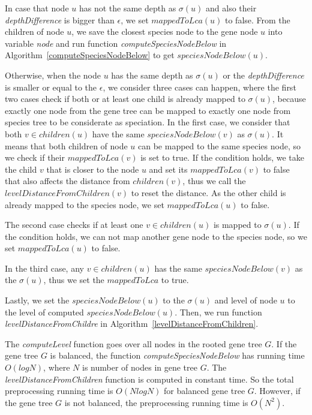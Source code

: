 In case that node $u$ has not the same depth as $\sigma(u)$ and also their \emph{depthDifference} is bigger than $\epsilon$, we set $mappedToLca(u)$ to false. From the children of node $u$, we save the closest species node to the gene node $u$ into variable \emph{node} and run function \emph{computeSpeciesNodeBelow} in Algorithm~\ref{computeSpeciesNodeBelow} to get $speciesNodeBelow(u)$. 

Otherwise, when the node $u$ has the same depth as $\sigma(u)$ or the \emph{depthDifference} is smaller or equal to the $\epsilon$, we consider three cases can happen, where the first two cases check if both or at least one child is already mapped to $\sigma(u)$, because exactly one node from the gene tree can be mapped to exactly one node from species tree to be considerate as speciation. In the first case, we consider that both $v \in children(u)$ have the same $speciesNodeBelow(v)$ as $\sigma(u)$. It means that both children of node $u$ can be mapped to the same species node, so we check if their $mappedToLca(v)$ is set to true. If the condition holds, we take the child $v$ that is closer to the node $u$ and set its $mappedToLca(v)$ to false that also affects the distance from $children(v)$, thus we call the $levelDistanceFromChildren(v)$ to reset the distance. As the other child is already mapped to the species node, we set $mappedToLca(u)$ to false.

The second case checks if at least one $v \in children(u)$ is mapped to $\sigma(u)$. If the condition holds, we can not map another gene node to the species node, so we set $mappedToLca(u)$ to false. 

In the third case, any $v \in children (u)$ has the same $speciesNodeBelow(v)$ as the $\sigma(u)$, thus we set the $mappedToLca$ to true.

Lastly, we set the $speciesNodeBelow(u)$ to the $\sigma(u)$ and level of node $u$ to the level of computed $speciesNodeBelow(u)$. Then, we run function \emph{levelDistanceFromChildre} in Algorithm~\ref{levelDistanceFromChildren}.

The \emph{computeLevel} function goes over all nodes in the rooted gene tree $G$. If the gene tree $G$ is balanced, the function \emph{computeSpeciesNodeBelow} has running time $O(log N)$, where $N$ is number of nodes in gene tree $G$. The \emph{levelDistanceFromChildren} function is computed in constant time. So the total preprocessing running time is $O(N log N)$ for balanced gene tree $G$. However, if the gene tree $G$ is not balanced, the preprocessing running time is $O(N^2)$.

